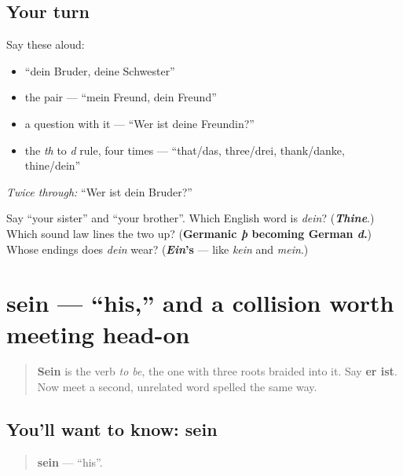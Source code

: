 \subsection*{Your turn}
Say these aloud:

\begin{itemize}
\raggedright
  \item \textquotedblleft{}dein Bruder, deine Schwester\textquotedblright{}
  \item the pair — \textquotedblleft{}mein Freund, dein Freund\textquotedblright{}
  \item a question with it — \textquotedblleft{}Wer ist deine Freundin?\textquotedblright{}
  \item the \emph{th} to \emph{d} rule, four times — \textquotedblleft{}that/das, three/drei, thank/danke, thine/dein\textquotedblright{}
\end{itemize}

\emph{Twice through:} \textquotedblleft{}Wer ist dein Bruder?\textquotedblright{}

\begin{tcolorbox}[breakable,colback=teal!4,colframe=teal!35!black,title={Before you move on}]
Say \textquotedblleft{}your sister\textquotedblright{} and \textquotedblleft{}your brother\textquotedblright{}. Which English word is \emph{dein}? (\emph{\textbf{Thine}}.) Which sound law lines the two up? (\textbf{Germanic \emph{þ} becoming German \emph{d}.}) Whose endings does \emph{dein} wear? (\textbf{\emph{Ein}'s} — like \emph{kein} and \emph{mein}.)
\end{tcolorbox}
\section[sein]{sein — \textquotedblleft{}his,\textquotedblright{} and a collision worth meeting head-on}

\label{lesson:GE-C36-sein-his}



\begin{quote}
\textbf{Sein} is the verb \emph{to be}, the one with three roots braided into it. Say \textbf{er ist}. Now meet a second, unrelated word spelled the same way.
\end{quote}

\subsection*{You'll want to know: sein}
\begin{quote}
\textbf{sein} — \textquotedblleft{}his\textquotedblright{}.
\end{quote}

